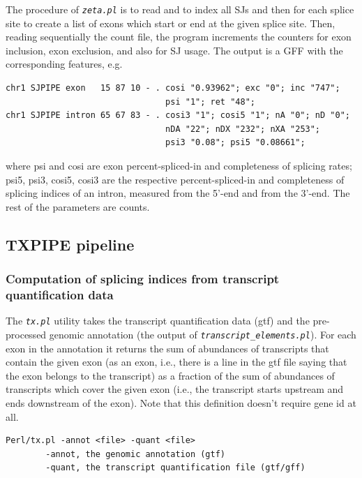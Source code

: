 \documentclass{article}
\newcommand{\prog}[1]{{\tt\em #1}}
\begin{document}
The procedure of \prog{zeta.pl} is to read and to index all SJs and then for each splice site to create a list of exons which start or end at the given splice site. 
Then, reading sequentially the count file, the program increments the counters for exon inclusion, exon exclusion, and also for SJ usage. The output is a GFF with 
the corresponding features, e.g.
\begin{verbatim}
chr1 SJPIPE exon   15 87 10 - . cosi "0.93962"; exc "0"; inc "747"; 
                                psi "1"; ret "48";
chr1 SJPIPE intron 65 67 83 - . cosi3 "1"; cosi5 "1"; nA "0"; nD "0"; 
                                nDA "22"; nDX "232"; nXA "253"; 
                                psi3 "0.08"; psi5 "0.08661";
\end{verbatim}
where psi and cosi are exon percent-spliced-in and completeness of splicing rates; psi5, psi3, cosi5, cosi3 
are the respective percent-spliced-in and completeness of splicing indices of an intron, measured from the 
5'-end and from the 3'-end. The rest of the parameters are counts.


\subsection{TXPIPE pipeline}
\label{sec::txpipe}
\subsubsection[Splicing indices from transcript quantification data]{Computation of splicing indices from transcript quantification data}

The \prog{tx.pl} utility takes the transcript quantification data (gtf) and the pre-processed genomic annotation (the output of
\prog{transcript\_elements.pl}). For each exon in the annotation it returns the sum of abundances of transcripts that contain 
the given exon (as an exon, i.e., there is a line in the gtf file saying that the exon belongs to the transcript) as a fraction 
of the sum of abundances of transcripts which cover the given exon (i.e., the transcript starts upstream and ends downstream of the 
exon). Note that this definition doesn't require gene id at all.

\begin{verbatim}
Perl/tx.pl -annot <file> -quant <file>
        -annot, the genomic annotation (gtf)
        -quant, the transcript quantification file (gtf/gff)
\end{verbatim}
\end{document}
